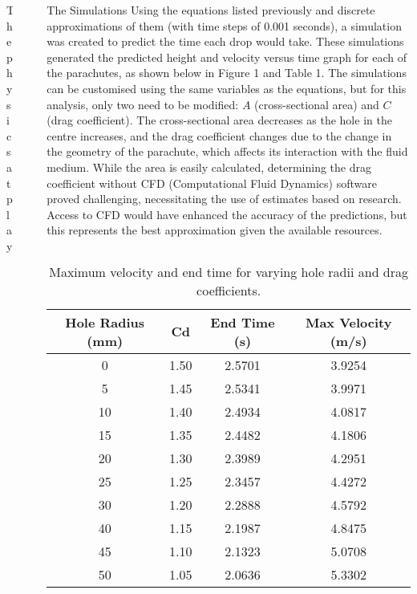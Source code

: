 \documentclass[final]{beamer}
\newlength{\sepwidth}
\newlength{\colwidth}
\newcommand{\separatorcolumn}{\begin{column}{\sepwidth}\end{column}}
\begin{document}
\begin{frame}[t]
\begin{columns}[t]
\begin{column}{\colwidth}
\begin{alertblock}{The physics at play}
\end{alertblock}
\end{column}

\separatorcolumn

\begin{column}{\colwidth}

\begin{block}{The Simulations}
Using the equations listed previously and discrete approximations of them (with time steps of 0.001 seconds), a simulation was created to predict the time each drop would take. These simulations generated the predicted height and velocity versus time graph for each of the parachutes, as shown below in Figure 1 and Table 1. The simulations can be customised using the same variables as the equations, but for this analysis, only two need to be modified: $A$ (cross-sectional area) and $C$ (drag coefficient). The cross-sectional area decreases as the hole in the centre increases, and the drag coefficient changes due to the  change in the geometry of the parachute, which affects its interaction with the fluid medium. While the area is easily calculated, determining the drag coefficient without CFD (Computational Fluid Dynamics) software proved challenging, necessitating the use of estimates based on research. Access to CFD would have enhanced the accuracy of the predictions, but this represents the best approximation given the available resources.

\begin{columns}

    \begin{column}{0.5\textwidth}  %
        \begin{table}
        \centering
        \begin{tabular}{cccc}
        \toprule
        \textbf{Hole Radius (mm)} & \textbf{Cd} & \textbf{End Time (s)} & \textbf{Max Velocity (m/s)} \\
        \midrule
        0  & 1.50 & 2.5701 & 3.9254 \\
        5  & 1.45 & 2.5341 & 3.9971 \\
        10 & 1.40 & 2.4934 & 4.0817 \\
        15 & 1.35 & 2.4482 & 4.1806 \\
        20 & 1.30 & 2.3989 & 4.2951 \\
        25 & 1.25 & 2.3457 & 4.4272 \\
        30 & 1.20 & 2.2888 & 4.5792 \\
        40 & 1.15 & 2.1987 & 4.8475 \\
        45 & 1.10 & 2.1323 & 5.0708 \\
        50 & 1.05 & 2.0636 & 5.3302 \\
        \bottomrule
        \end{tabular}
        \caption{Maximum velocity and end time for varying hole radii and drag coefficients.}
        \end{table}
    \end{column}


\end{columns}
\end{block}
\end{column}
\end{columns}
\end{frame}
\end{document}

